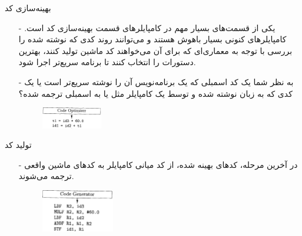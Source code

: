 \begin{frame}{بهینه‌سازی کد }
\begin{itemize}\itemr
\item[-]
یکی از قسمت‌های بسیار مهم در کامپایلر‌های قسمت بهینه‌سازی کد است. کامپایلر‌های کنونی بسیار باهوش هستند و می‌توانند روند کدی که نوشته شده را بررسی با توجه به 
معماری‌ای که برای آن می‌خواهند کد ماشین تولید کنند، بهترین دستورات را انتخاب کنند تا برنامه سریع‌تر اجرا شود.

\item[-]
به نظر شما یک کد اسمبلی که یک برنامه‌نویس آن را نوشته سریع‌تر است یا یک کدی که به زبان 
نوشته شده و توسط یک کامپایلر مثل 
یا 
به اسمبلی ترجمه شده؟
\vspace{6mm}
\begin{figure}[H]
\begin{center}
\includegraphics[width=0.25\textwidth, height=0.31\textheight, angle=1]{docs/images/optimizer}
\end{center}
\end{figure}
\end{itemize}
\end{frame}

\begin{frame}{تولید کد}
\begin{itemize}\itemr
\item[-]
در آخرین مرحله، کد‌های بهینه شده، از کد میانی کامپایلر به کد‌های ماشین واقعی ترجمه می‌شوند.
\vspace{6mm}
\begin{figure}[H]
\begin{center}
\includegraphics[width=0.3\textwidth, height=0.4\textheight, angle=1]{docs/images/generator}
\end{center}
\end{figure}
\end{itemize}
\end{frame}
